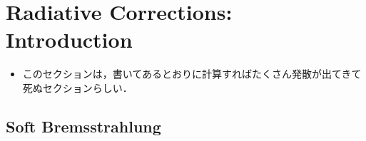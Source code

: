 \section{Radiative Corrections: Introduction}
\begin{itemize}
    \item このセクションは，書いてあるとおりに計算すればたくさん発散が出てきて死ぬセクションらしい．
\end{itemize}
\subsection{Soft Bremsstrahlung}
